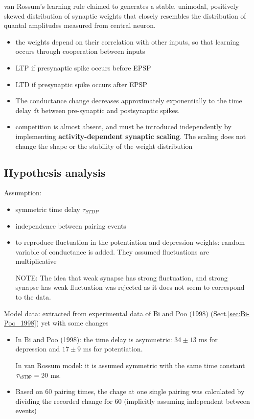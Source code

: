 van Rossum's learning rule claimed to generates a stable, unimodal, positively
skewed distribution of synaptic weights that closely resembles the distribution
of quantal amplitudes measured from central neuron.
\begin{itemize}
  \item the weights depend on their correlation with other inputs, so that learning occurs
through cooperation between inputs

  \item LTP if presynaptic spike occurs before EPSP
  
  \item LTD if presynaptic spike occurs after EPSP
  
  \item The conductance change decreases
  approximately exponentially to the time delay $\delta t$ between pre-synaptic
  and postsynaptic spikes.
   
  \item  competition is almost absent, and must be introduced independently by
  implementing {\bf activity-dependent synaptic scaling}.  The scaling does not
  change the shape or the stability of the weight distribution
\end{itemize}

\subsection{Hypothesis analysis}

Assumption:
\begin{itemize}
  \item symmetric time delay $\tau_{STDP}$
  
  \item independence between pairing events
  
  \item to reproduce fluctuation in the potentiation and depression weights:
  random variable of conductance is added. They assumed fluctuations are
  multiplicative
  
NOTE: The idea that weak synapse has strong
  fluctuation, and strong synapse has weak fluctuation was rejected as it does
  not seem to correspond to the data.
  
  
\end{itemize}


Model data: extracted from experimental data of Bi and Poo (1998)
\citep{bi1998} (Sect.\ref{sec:Bi-Poo_1998})
yet with some changes
\begin{itemize}
  \item In Bi and Poo (1998): the time delay is asymmetric: $34\pm 13$ ms for
  depression and $17\pm 9$ ms for potentiation.
  
  In van Rossum model: it is assumed symmetric with the same time constant
  $\tau_\STDP = 20$ ms.
  
  \item Based on 60 pairing times, the chage at one single pairing was
  calculated by dividing the recorded change for 60 (implicitly assuming
  independent between events)
\end{itemize}

